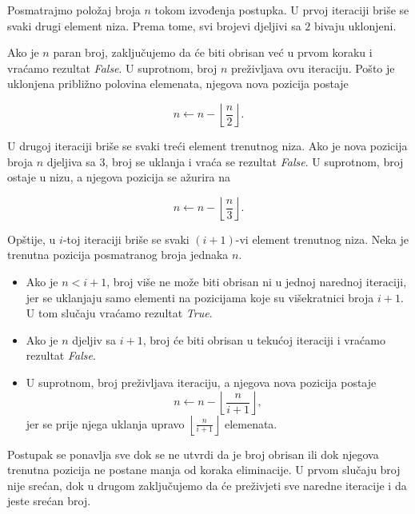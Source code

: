  \begin{solution}
 	
 	Posmatrajmo položaj broja $n$ tokom izvođenja postupka. U prvoj iteraciji briše se svaki drugi element niza. Prema tome, svi brojevi djeljivi sa $2$ bivaju uklonjeni.
 	
 	Ako je $n$ paran broj, zaključujemo da će biti obrisan već u prvom koraku i vraćamo rezultat \emph{False}. U suprotnom, broj $n$ preživljava ovu iteraciju. Pošto je uklonjena približno polovina elemenata, njegova nova pozicija postaje
 	
$$
 	n \leftarrow n - \left\lfloor \frac{n}{2} \right\rfloor .
$$
 	
 	U drugoj iteraciji briše se svaki treći element trenutnog niza. Ako je nova pozicija broja $n$ djeljiva sa $3$, broj se uklanja i vraća se rezultat \emph{False}. U suprotnom, broj ostaje u nizu, a njegova pozicija se ažurira na
 	
 	$$
 	n \leftarrow n - \left\lfloor \frac{n}{3} \right\rfloor.
 	$$
 	
 	Opštije, u $i$-toj iteraciji briše se svaki $(i+1)$-vi element trenutnog niza. Neka je trenutna pozicija posmatranog broja jednaka $n$.
 	
 	\begin{itemize}
 		\item Ako je $n < i+1$, broj više ne može biti obrisan ni u jednoj narednoj iteraciji, jer se uklanjaju samo elementi na pozicijama koje su višekratnici broja $i+1$. U tom slučaju vraćamo rezultat \emph{True}.
 		
 		\item Ako je $n$ djeljiv sa $i+1$, broj će biti obrisan u tekućoj iteraciji i vraćamo rezultat \emph{False}.
 		
 		\item U suprotnom, broj preživljava iteraciju, a njegova nova pozicija postaje
 		$$
 		n \leftarrow n - \left\lfloor \frac{n}{i+1} \right\rfloor ,
 		$$
 		jer se prije njega uklanja upravo
 		$\left\lfloor \frac{n}{i+1} \right\rfloor$
 		elemenata.

 		
 	\end{itemize}
 	
 	Postupak se ponavlja sve dok se ne utvrdi da je broj obrisan ili dok njegova trenutna pozicija ne postane manja od koraka eliminacije. U prvom slučaju broj nije srećan, dok u drugom zaključujemo da će preživjeti sve naredne iteracije i da jeste srećan broj.
 	
 \end{solution}
 
